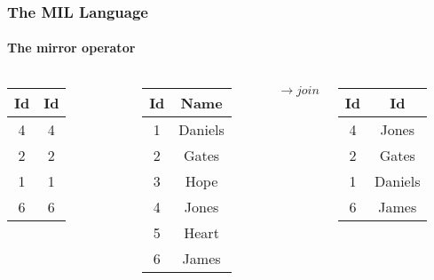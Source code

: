 \documentclass{beamer}
\begin{document}
\begin{frame}
  \frametitle{The MIL Language}
  \framesubtitle{The mirror operator}

  \begin{columns}

  \column{1cm}

  \begin{tabular}{|c|c|}
    \hline
    Id & Id \\
    \hline
    4 & 4 \\
    2 & 2 \\
    1 & 1 \\
    6 & 6 \\
    \hline
  \end{tabular}

  \column{1cm}

  \begin{tabular}{|c|c|}
    \hline
    Id & Name \\
    \hline
    1 & Daniels \\
    2 & Gates \\
    3 & Hope \\
    4 & Jones \\
    5 & Heart \\
    6 & James \\
    \hline
  \end{tabular}

  \column{1cm}

  $\longrightarrow{join}$

  \column{1cm}

  \begin{tabular}{|c|c|}
    \hline
    Id & Id \\
    \hline
    4 & Jones \\
    2 & Gates \\
    1 & Daniels \\
    6 & James \\
    \hline
  \end{tabular}

  \end{columns}

\end{frame}
\end{document}
